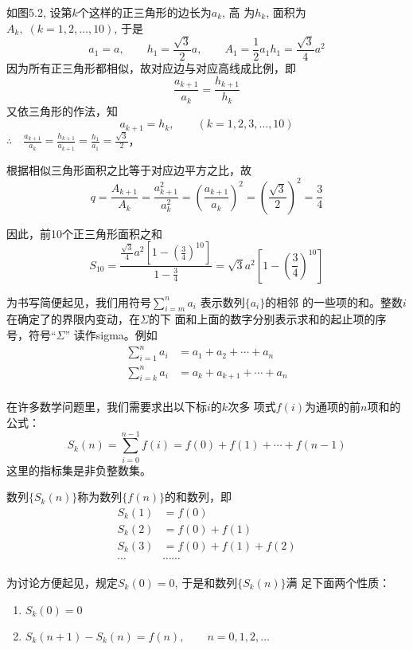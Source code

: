 \begin{solution}
    如图5.2, 设第$k$个这样的正三角形的边长为$a_k$, 高
    为$h_k$, 面积为$A_k,\; (k=1,2,\ldots,10)$, 于是
\[a_1=a,\qquad h_1=\frac{\sqrt{3}}{2}a,\qquad A_1=\frac{1}{2}a_1h_1=\frac{\sqrt{3}}{4}a^2\]
    因为所有正三角形都相似，故对应边与对应高线成比例，即
\[\frac{a_{k+1}}{a_{k}}=\frac{h_{k+1}}{h_k}\]
又依三角形的作法，知
\[a_{k+1}=h_k,\qquad (k=1,2,3,\ldots,10)\]
$\therefore\quad \frac{a_{k+1}}{a_{k}}=\frac{h_{k+1}}{a_{k+1}}=\frac{h_1}{a_1}=\frac{\sqrt{3}}{2}$，

根据相似三角形面积之比等于对应边平方之比，故
\[q=\frac{A_{k+1}}{A_k}=\frac{a^2_{k+1}}{a^2_k}=\left(\frac{a_{k+1}}{a_k}\right)^2=\left(\frac{\sqrt{3}}{2}\right)^2=\frac{3}{4}\]

因此，前10个正三角形面积之和
\[S_{10}=\frac{\frac{\sqrt{3}}{4}a^2\left[1-\left(\frac{3}{4}\right)^{10}\right]}{1-\frac{3}{4}}=\sqrt{3}a^2\left[1-\left(\frac{3}{4}\right)^{10}\right]\]
\end{solution}

为书写简便起见，我们用符号$\displaystyle\sum^n_{i=m}a_i$
表示数列$\{a_i\}$的相邻
的一些项的和。整数$i$在确定了的界限内变动，在$\Sigma$的下
面和上面的数字分别表示求和的起止项的序号，符号“$\Sigma$”
读作sigma。例如
\[\begin{split}
    \sum^n_{i=1}a_i&=a_1+a_2+\cdots+a_n\\
    \sum^n_{i=k}a_i&=a_k+a_{k+1}+\cdots+a_n\\
\end{split}\]

在许多数学问题里，我们需要求出以下标$i$的$k$次多
项式$f(i)$为通项的前$n$项和的公式：
\[S_k(n)=\sum^{n-1}_{i=0}f(i)=f(0)+f(1)+\cdots+f(n-1)\]
这里的指标集是非负整数集。

数列$\{S_k(n)\}$称为数列$\{f(n)\}$的和数列，即
\[\begin{split}
    S_k(1)&=f(0)\\
    S_k(2)&=f(0)+f(1)\\
    S_k(3)&=f(0)+f(1)+f(2)\\
    \cdots&\cdots\cdots
\end{split}\]

为讨论方便起见，规定$S_k(0)=0$, 于是和数列$\{S_k(n)\}$满
足下面两个性质：
\begin{enumerate}
    \item $S_k(0)=0$
    \item $S_k(n+1)-S_k(n)=f(n),\qquad n=0,1,2,\ldots$
\end{enumerate}

